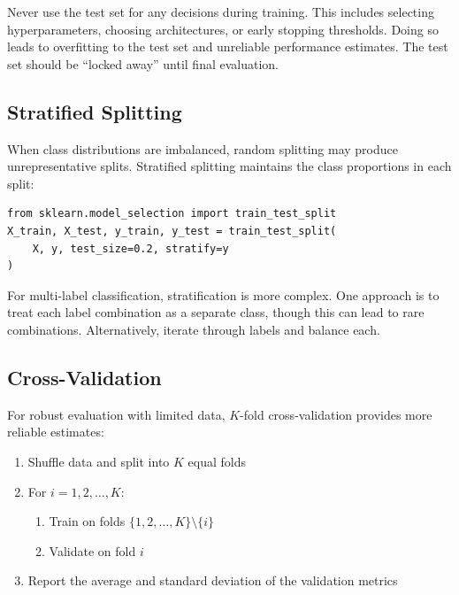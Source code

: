 \begin{note}
Never use the test set for any decisions during training. This includes selecting hyperparameters, choosing architectures, or early stopping thresholds. Doing so leads to overfitting to the test set and unreliable performance estimates. The test set should be ``locked away'' until final evaluation.
\end{note}

\subsection{Stratified Splitting}

When class distributions are imbalanced, random splitting may produce unrepresentative splits. Stratified splitting maintains the class proportions in each split:

\begin{verbatim}
from sklearn.model_selection import train_test_split
X_train, X_test, y_train, y_test = train_test_split(
    X, y, test_size=0.2, stratify=y
)
\end{verbatim}

For multi-label classification, stratification is more complex. One approach is to treat each label combination as a separate class, though this can lead to rare combinations. Alternatively, iterate through labels and balance each.

\subsection{Cross-Validation}

For robust evaluation with limited data, $K$-fold cross-validation provides more reliable estimates:

\begin{algorithm}[H]
\caption[K-Fold Cross-Validation]{$K$-Fold Cross-Validation}
\begin{enumerate}
    \item Shuffle data and split into $K$ equal folds
    \item For $i = 1, 2, \ldots, K$:
    \begin{enumerate}
        \item Train on folds $\{1, 2, \ldots, K\} \setminus \{i\}$
        \item Validate on fold $i$
    \end{enumerate}
    \item Report the average and standard deviation of the validation metrics
\end{enumerate}
\end{algorithm}

